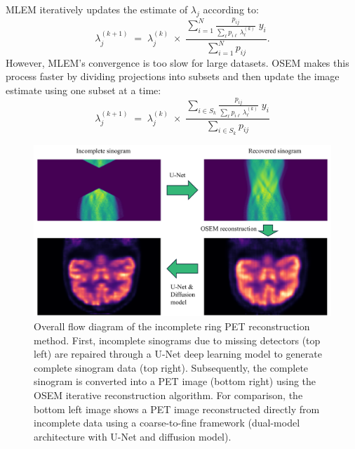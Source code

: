 \documentclass[12pt]{iopart}
\begin{document}
MLEM iteratively updates the estimate of $\lambda_j$ according to:
\begin{equation}
    \lambda_j^{(k+1)}
    \;=\;
    \lambda_j^{(k)}
    \;\times\;
    \frac{\displaystyle \sum_{i=1}^{N} \frac{p_{ij}}{\sum_{\ell} p_{i\ell}\,\lambda_{\ell}^{(k)}} \; y_i}
    {\displaystyle \sum_{i=1}^{N} p_{ij}}.
\end{equation}
However, MLEM's convergence is too slow for large datasets. OSEM makes this process faster by dividing projections into subsets and then update the image estimate using one subset at a time:
\begin{equation}
    \lambda_j^{(k+1)}
\;=\;
\lambda_j^{(k)}
\;\times\;
\frac{\displaystyle \sum_{i \in S_{k}} \frac{p_{ij}}{\sum_{\ell} p_{i\ell}\,\lambda_{\ell}^{(k)}} \; y_i}
{\displaystyle \sum_{i \in S_{k}} p_{ij}}
\end{equation}
\begin{figure}[ht]
    \centering
    \includegraphics[width=\textwidth]{Images/reconstruction_workflow}
    \vspace{-.5cm}
    \caption{Overall flow diagram of the incomplete ring PET reconstruction method. First, incomplete sinograms due to missing detectors (top left) are repaired through a U-Net deep learning model to generate complete sinogram data (top right). Subsequently, the complete sinogram is converted into a PET image (bottom right) using the OSEM iterative reconstruction algorithm. For comparison, the bottom left image shows a PET image reconstructed directly from incomplete data using a coarse-to-fine framework (dual-model architecture with U-Net and diffusion model). 
    }
    \vspace{-.2cm}
    \label{fig:reconstruction_workflow}
\end{figure}
\end{document}
